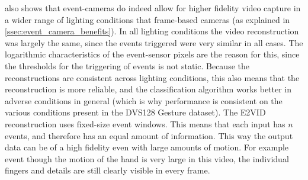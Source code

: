  also shows that event-cameras do indeed allow for higher fidelity video capture in a wider range of lighting conditions that frame-based cameras (as explained in \cref{ssec:event_camera_benefits}). In all lighting conditions the video reconstruction was largely the same, since the events triggered were very similar in all cases. The logarithmic characteristics of the event-sensor pixels are the reason for this, since the thresholds for the triggering of events is not static. Because the reconstructions are consistent across lighting conditions, this also means that the reconstruction is more reliable, and the classification algorithm works better in adverse conditions in general (which is why performance is consistent on the various conditions present in the DVS128 Gesture dataset). The E2VID reconstruction uses fixed-size event windows. This means that each input has $ n $ events, and therefore has an equal amount of information. This way the output data can be of a high fidelity even with large amounts of motion. For example event though the motion of the hand is very large in this video, the individual fingers and details are still clearly visible in every frame.


